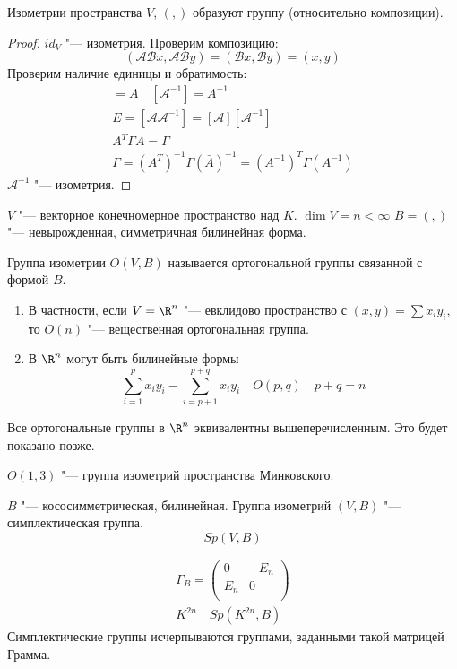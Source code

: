 \begin{conseq}
	Изометрии пространства $V$, $(,)$ образуют группу (относительно композиции).
\end{conseq}
\begin{proof}
	$id_V $  "--- изометрия.
	Проверим композицию:
	\[ (\mathcal A \mathcal B x, \mathcal A \mathcal B y) = (\mathcal B x, \mathcal B y) = (x, y) \]
	Проверим наличие единицы и обратимость:
	\begin{gather*}
		[\mathcal A ] = A \quad [\mathcal A ^{-1}] = A ^{-1} \\
		E = [\mathcal A \mathcal A ^{-1}] = [\mathcal A] [\mathcal A ^{-1}] \\
		A^T \Gamma \bar A  = \Gamma \\
		\Gamma = (A^T)^{-1} \Gamma (\bar A)^{-1} = (A^{-1})^T \Gamma \overline{(A^{-1})}
	\end{gather*}
	$\mathcal A^{-1}$ "--- изометрия.
\end{proof}

\begin{Def}
	$V$ "--- векторное конечномерное пространство над $K$. $\dim V = n < \infty$
	$B = (,)$ "--- невырожденная, симметричная билинейная форма.

	Группа изометрии $O(V, B)$ называется ортогональной группы связанной с формой $B$.  
\end{Def}
\begin{Def}\hfill
    \begin{enumerate}
    \item В частности, если $V = \R^n$ "--- евклидово пространство с $(x, y) = \sum x_i y_i$,
        	то $O(n)$ "--- вещественная ортогональная группа.
     \item  В $\R^n$ могут быть билинейные формы
     \[ \sum_{i = 1}^p x_iy_i - \sum_{i = p + 1}^{p + q} x_i y_i \quad O(p, q) \quad p + q = n \]
    \end{enumerate}
Все ортогональные группы в $\R^n$ эквивалентны вышеперечисленным.
Это будет показано позже.
\end{Def}
\begin{exmp}
$O(1, 3)$ "--- группа изометрий пространства Минковского.
\end{exmp}

\begin{Def}
	$B$ "--- кососимметрическая, билинейная.
	Группа изометрий $(V, B)$ "--- симплектическая группа.
	\[ Sp(V, B) \]
\end{Def}

\begin{exmp}
	\begin{gather*}
		\Gamma_B = \begin{pmatrix} 0 & -E_n \\ E_n & 0 \\ \end{pmatrix} \\
		K^{2n} \quad Sp(K^{2n}, B)
	\end{gather*}
	Симплектические группы исчерпываются группами, заданными такой матрицей Грамма.
\end{exmp}

